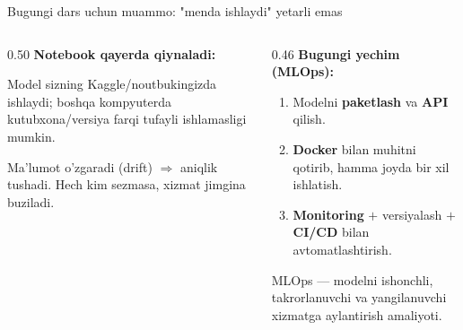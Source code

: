 \documentclass[aspectratio=169,11pt]{beamer}
\begin{document}
\begin{frame}{Bugungi dars uchun muammo: "menda ishlaydi" yetarli emas}
  \begin{columns}[T]
    \begin{column}{0.50\textwidth}
      \textbf{Notebook qayerda qiynaladi:}\\[3pt]
      \small
      \begin{tcolorbox}[warnbox,title={Faqat sizning muhitingiz},top=2pt,bottom=2pt]
        \footnotesize
        Model sizning Kaggle/noutbukingizda ishlaydi; boshqa kompyuterda
        kutubxona/versiya farqi tufayli ishlamasligi mumkin.
      \end{tcolorbox}
      \vspace{3pt}
      \begin{tcolorbox}[warnbox,title={Vaqt bilan eskiradi},top=2pt,bottom=2pt]
        \footnotesize
        Ma'lumot o'zgaradi (drift) $\Rightarrow$ aniqlik tushadi. Hech kim
        sezmasa, xizmat jimgina buziladi.
      \end{tcolorbox}
    \end{column}
    \begin{column}{0.46\textwidth}
      \textbf{Bugungi yechim (MLOps):}\\[4pt]
      \small
      \begin{enumerate}\setlength\itemsep{4pt}
        \item Modelni \textbf{paketlash} va \textbf{API} qilish.
        \item \textbf{Docker} bilan muhitni qotirib, hamma joyda bir xil ishlatish.
        \item \textbf{Monitoring} $+$ versiyalash $+$ \textbf{CI/CD} bilan
              avtomatlashtirish.
      \end{enumerate}
      \vspace{5pt}
      \begin{tcolorbox}[okbox,top=2pt,bottom=2pt]
        \footnotesize
        MLOps --- modelni ishonchli, takrorlanuvchi va yangilanuvchi xizmatga
        aylantirish amaliyoti.
      \end{tcolorbox}
    \end{column}
  \end{columns}
\end{frame}

\end{document}
